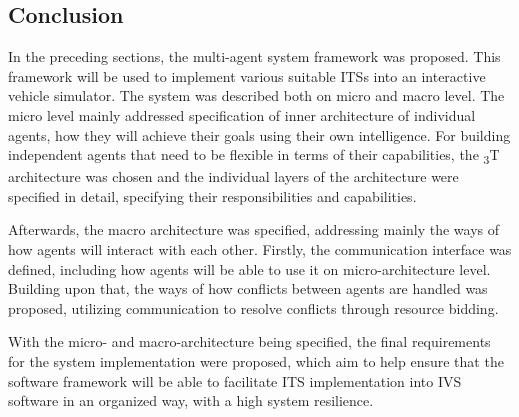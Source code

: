 \documentclass[main.tex]{subfiles}
\begin{document}



\clearpage

\subsection{Conclusion}

In the preceding sections, the multi-agent system framework was proposed. This framework will be used to implement various 
suitable ITSs into an interactive vehicle simulator. The system was described both on micro and macro level. The micro level 
mainly addressed specification of inner architecture of individual agents, how they will achieve their goals using their 
own intelligence. For building independent agents that need to be flexible in terms of their capabilities, the \textsubscript{3}T
architecture was chosen and the individual layers of the architecture were specified in detail, specifying their responsibilities
and capabilities. 

Afterwards, the macro architecture was specified, addressing mainly the ways of how agents will interact with each other. 
Firstly, the communication interface was defined, including how agents will be able to use it on micro-architecture level.
Building upon that, the ways of how conflicts between agents are handled was proposed, utilizing communication to resolve 
conflicts through resource bidding. 

With the micro- and macro-architecture being specified, the final requirements for the system implementation were proposed, 
which aim to help ensure that the software framework will be able to facilitate ITS implementation into IVS software in an 
organized way, with a high system resilience.
\end{document}
